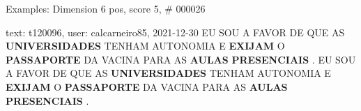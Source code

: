 \begin{frame}{Examples: Dimension 6 pos, score 5, \# 000026}
\footnotesize
\begin{exampleblock}{text: t120096, user: calcarneiro85, 2021-12-30}
EU SOU A FAVOR DE QUE AS \textbf{UNIVERSIDADES} TENHAM AUTONOMIA E 
\textbf{EXIJAM} O \textbf{PASSAPORTE} DA VACINA PARA AS \textbf{AULAS} 
\textbf{PRESENCIAIS} . EU SOU A FAVOR DE QUE AS \textbf{UNIVERSIDADES} TENHAM 
AUTONOMIA E \textbf{EXIJAM} O \textbf{PASSAPORTE} DA VACINA PARA AS 
\textbf{AULAS} \textbf{PRESENCIAIS} . 
\end{exampleblock}
\end{frame}
